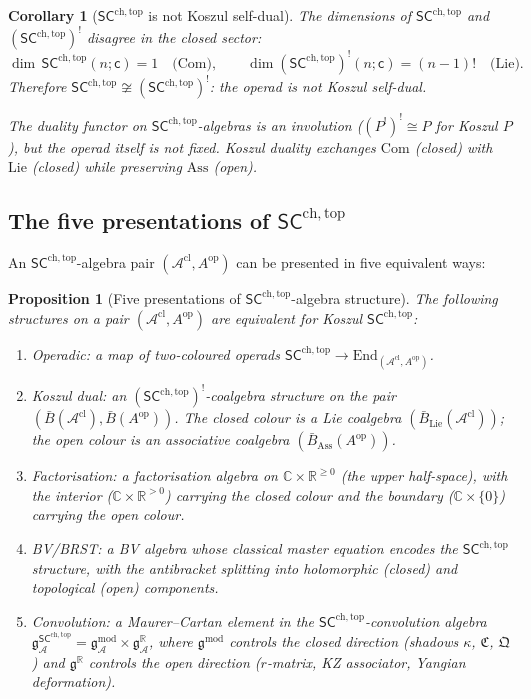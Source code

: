 \documentclass[11pt,reqno]{amsart}
\newtheorem{proposition}[theorem]{Proposition}
\newtheorem{corollary}[theorem]{Corollary}
\theoremstyle{definition}
\theoremstyle{remark}
\providecommand{\cA}{\mathcal{A}}
\providecommand{\fg}{\mathfrak{g}}
\providecommand{\SCchtop}{\ensuremath{\mathsf{SC}^{\mathrm{ch,top}}}}
\providecommand{\barB}{\bar{B}}
\providecommand{\bC}{\mathbb{C}}
\providecommand{\bR}{\mathbb{R}}
\providecommand{\End}{\mathrm{End}}
\begin{document}
\begin{corollary}[$\SCchtop$ is not Koszul self-dual]
\label{cor:e-sc-not-selfdual}
The dimensions of $\SCchtop$ and $(\SCchtop)^!$ disagree in the
closed sector:
\[
\dim\,\SCchtop(n;\mathsf{c}) = 1
\quad\text{(Com)},
\qquad
\dim(\SCchtop)^!(n;\mathsf{c}) = (n{-}1)!
\quad\text{(Lie)}.
\]
Therefore $\SCchtop \not\cong (\SCchtop)^!$: the operad is
\emph{not} Koszul self-dual.

The duality \emph{functor} on $\SCchtop$-algebras is an
involution ($(P^!)^! \cong P$ for Koszul $P$), but the
operad itself is not fixed. Koszul duality exchanges
$\mathrm{Com}$ (closed) with $\mathrm{Lie}$ (closed) while
preserving $\mathrm{Ass}$ (open).
\end{corollary}

\subsection{The five presentations of $\SCchtop$}

An $\SCchtop$-algebra pair $(\cA^{\mathrm{cl}}, A^{\mathrm{op}})$
can be presented in five equivalent ways:

\begin{proposition}[Five presentations of $\SCchtop$-algebra
structure]\label{prop:e-five-presentations}
The following structures on a pair
$(\cA^{\mathrm{cl}}, A^{\mathrm{op}})$ are equivalent for
Koszul $\SCchtop$:
\begin{enumerate}[label=\textup{(\roman*)}]
\item \emph{Operadic:}
 a map of two-coloured operads
 $\SCchtop \to \End_{(\cA^{\mathrm{cl}}, A^{\mathrm{op}})}$.
\item \emph{Koszul dual:}
 an $(\SCchtop)^!$-coalgebra structure on the pair
 $(\barB(\cA^{\mathrm{cl}}), \barB(A^{\mathrm{op}}))$.
 The closed colour is a Lie coalgebra
 $(\barB_{\mathrm{Lie}}(\cA^{\mathrm{cl}}))$; the open colour is
 an associative coalgebra $(\barB_{\mathrm{Ass}}(A^{\mathrm{op}}))$.
\item \emph{Factorisation:}
 a factorisation algebra on $\bC \times \bR^{\ge 0}$
 (the upper half-space), with the interior ($\bC \times \bR^{>0}$)
 carrying the closed colour and the boundary
 ($\bC \times \{0\}$) carrying the open colour.
\item \emph{BV/BRST:}
 a BV algebra whose classical master equation encodes the
 $\SCchtop$ structure, with the antibracket splitting into
 holomorphic (closed) and topological (open) components.
\item \emph{Convolution:}
 a Maurer--Cartan element in the $\SCchtop$-convolution algebra
 $\fg^{\SCchtop}_\cA
 = \fg^{\mathrm{mod}}_\cA \times \fg^{\bR}_\cA$,
 where $\fg^{\mathrm{mod}}$ controls the closed direction
 (shadows $\kappa$, $\mathfrak{C}$, $\mathfrak{Q}$) and
 $\fg^{\bR}$ controls the open direction ($r$-matrix, KZ
 associator, Yangian deformation).
\end{enumerate}
\end{proposition}
\end{document}
